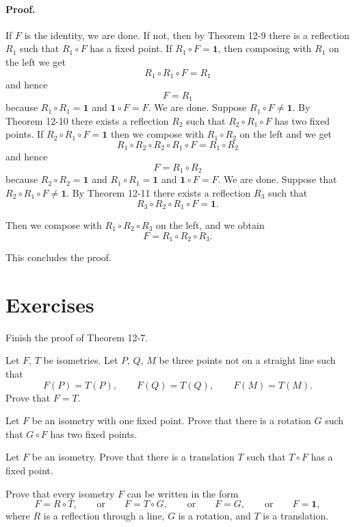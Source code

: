 \documentclass[12pt]{book} %
\begin{document}
\begin{ExerciseList}
\begin{ExerciseList}
\begin{ExerciseList}
\paragraph{Proof.}
If $F$ is the identity, we are done. If not, then by Theorem 12-9
there is a reflection $R_1$ such that $R_1 \circ F$ has a fixed point. If $R_1 \circ F = \mathbf{1}$,
then composing with $R_1$ on the left we get
\[
R_1 \circ R_1 \circ F = R_1
\]
and hence
\[
F = R_1
\]
because $R_1 \circ R_1 = \mathbf{1}$ and $\mathbf{1} \circ F = F$. We are done. Suppose $R_1 \circ F \ne \mathbf{1}$.
By Theorem 12-10 there exists a reflection $R_2$ such that $R_2 \circ R_1 \circ F$ has
two fixed points. If $R_2 \circ R_1 \circ F = \mathbf{1}$ then we compose with $R_1 \circ R_2$ on the
left and we get
\[
R_1 \circ R_2 \circ R_2 \circ R_1 \circ F = R_1 \circ R_2
\]
and hence
\[
F = R_1 \circ R_2
\]
because $R_2 \circ R_2 = \mathbf{1}$ and $R_1 \circ R_1 = \mathbf{1}$ and $\mathbf{1} \circ F = F$. We are done.
Suppose that $R_2 \circ R_1 \circ F \ne \mathbf{1}$. By Theorem 12-11 there exists a reflection $R_3$
such that
\[
R_3 \circ R_2 \circ R_1 \circ F = \mathbf{1}.
\]

Then we compose with $R_1 \circ R_2 \circ R_3$ on the left, and we obtain
\[
F = R_1 \circ R_2 \circ R_3.
\]

This concludes the proof.

\section*{Exercises}

\setcounter{Exercise}{0}
\begin{ExerciseList}
\Exercise Finish the proof of Theorem 12-7.

\Exercise Let $F$, $T$ be isometries. Let $P$, $Q$, $M$ be three points not on a straight line
such that
\[
F(P) = T(P),\qquad F(Q) = T(Q),\qquad F(M) = T(M).
\]
Prove that $F = T$.

\Exercise Let $F$ be an isometry with one fixed point. Prove that there is a rotation $G$
such that $G \circ F$ has two fixed points.

\Exercise Let $F$ be an isometry. Prove that there is a translation $T$ such that $T \circ F$ has
a fixed point.

\Exercise Prove that every isometry $F$ can be written in the form
\[
F = R \circ T,
\qquad \text{or} \qquad
F = T \circ G,
\qquad \text{or} \qquad
F = G,
\qquad \text{or} \qquad
F = \mathbf{1},
\]
where $R$ is a reflection through a line, $G$ is a rotation, and $T$ is a translation.


\end{ExerciseList}
\end{ExerciseList}
\end{ExerciseList}
\end{ExerciseList}
\end{document}
